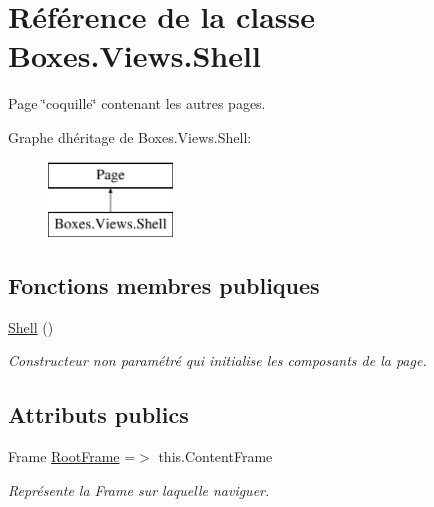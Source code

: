 \hypertarget{class_boxes_1_1_views_1_1_shell}{}\section{Référence de la classe Boxes.\+Views.\+Shell}
\label{class_boxes_1_1_views_1_1_shell}


Page \char`\"{}coquille\char`\"{} contenant les autres pages.  


Graphe d\textquotesingle{}héritage de Boxes.\+Views.\+Shell\+:\begin{figure}[H]
\begin{center}
\leavevmode
\includegraphics[height=2.000000cm]{class_boxes_1_1_views_1_1_shell}
\end{center}
\end{figure}
\subsection*{Fonctions membres publiques}
\begin{DoxyCompactItemize}
\item 
\hyperlink{class_boxes_1_1_views_1_1_shell_ae1dc32ec2e7d16880de8b6a62762c93b}{Shell} ()
\begin{DoxyCompactList}\small\item\em Constructeur non paramétré qui initialise les composants de la page. \end{DoxyCompactList}\end{DoxyCompactItemize}
\subsection*{Attributs publics}
\begin{DoxyCompactItemize}
\item 
Frame \hyperlink{class_boxes_1_1_views_1_1_shell_a0497de869176bf216e46152a376dcf30}{Root\+Frame} =$>$ this.\+Content\+Frame
\begin{DoxyCompactList}\small\item\em Représente la Frame sur laquelle naviguer. \end{DoxyCompactList}\end{DoxyCompactItemize}

